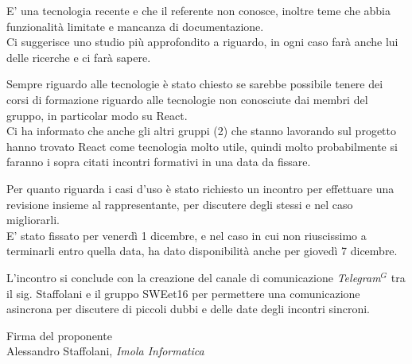 \documentclass[a4paper, 11pt]{article}
\begin{document}
E' una tecnologia recente e che il referente non conosce, inoltre teme che abbia funzionalità limitate e mancanza di documentazione. \\
Ci suggerisce uno studio più approfondito a riguardo, in ogni caso farà anche lui delle ricerche e ci farà sapere.

Sempre riguardo alle tecnologie è stato chiesto se sarebbe possibile tenere dei corsi di formazione riguardo alle tecnologie non conosciute dai membri del gruppo, in particolar modo su React. \\
Ci ha informato che anche gli altri gruppi (2) che stanno lavorando sul progetto hanno trovato React come tecnologia molto utile,
 quindi molto probabilmente si faranno i sopra citati incontri formativi in una data da fissare.

Per quanto riguarda i casi d'uso è stato richiesto un incontro per effettuare una revisione insieme al rappresentante, per discutere degli stessi e nel caso migliorarli. \\
E' stato fissato per venerdì 1 dicembre, e nel caso in cui non riuscissimo a terminarli entro quella data, ha dato disponibilità anche per giovedì 7 dicembre.

L'incontro si conclude con la creazione del canale di comunicazione \emph{Telegram}$^{G}$ tra il sig. Staffolani 
e il gruppo SWEet16 per permettere una comunicazione asincrona per discutere di piccoli dubbi e delle date degli incontri sincroni.




\vspace{100pt}
\begin{flushleft}
\hfill Firma del proponente \\
\vspace{50pt}
\hfill Alessandro Staffolani, \textit{Imola Informatica}
\end{flushleft}
\end{document}
